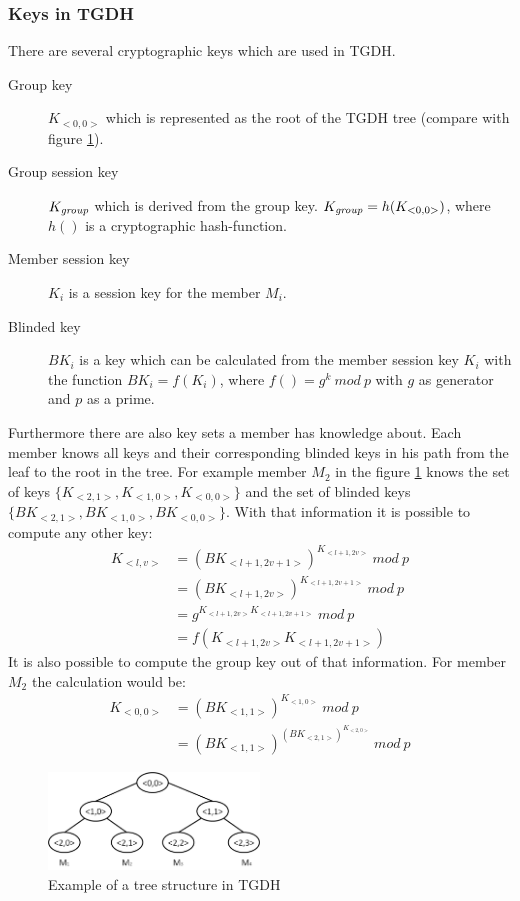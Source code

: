 \subsubsection{Keys in TGDH}
There are several cryptographic keys which are used in TGDH.
\begin{description}
\item[Group key] $K_{<0,0>}$ which is represented as the root of the TGDH tree (compare with figure \ref{fig:tgdh_tree}).
\item[Group session key] $K_{\text{\textit{group}}}$ which is derived from the group key. $K_{\text{\textit{group}}} = h(K_{<0,0>})$, where $h()$ is a cryptographic hash-function.
\item[Member session key] $K_i$ is a session key for the member $M_i$. 
\item[Blinded key] $BK_i$ is a key which can be calculated from the member session key $K_i$ with the function $BK_i = f(K_i)$, where $f() = g^k~mod~p$ with $g$ as generator and $p$ as a prime.
\end{description}
Furthermore there are also key sets a member has knowledge about. Each member knows all keys and their corresponding blinded keys in his path from the leaf to the root in the tree. For example member $M_2$ in the figure \ref{fig:tgdh_tree} knows the set of keys $\{K_{<2,1>}, K_{<1,0>}, K_{<0,0>}\}$ and the set of blinded keys $\{BK_{<2,1>}, BK_{<1,0>}, BK_{<0,0>}\}$. With that information it is possible to compute any other key:
\begin{align*}
K_{<l,v>} &= (BK_{<l+1, 2v+1>})^{K_{<l+1, 2v>}}~mod~p\\
&= (BK_{<l+1, 2v>})^{K_{<l+1, 2v+1>}}~mod~p\\
&= g^{K_{<l+1, 2v>}K_{<l+1, 2v+1>}}~mod~p\\
&= f(K_{<l+1, 2v>}K_{<l+1, 2v+1>})
\end{align*}
It is also possible to compute the group key out of that information. For member $M_2$ the calculation would be:
\begin{align*}
K_{<0,0>} &= (BK_{<1,1>})^{K_{<1,0>}}~mod~p\\
&= (BK_{<1,1>})^{(BK_{<2,1>})^{K_{<2,0>}}}~mod~p
\end{align*}
\begin{figure}[!h]
\centering\includegraphics[width=0.5\textwidth]{Images/tgdh_tree}
\caption{Example of a tree structure in TGDH}
\label{fig:tgdh_tree}
\end{figure}

